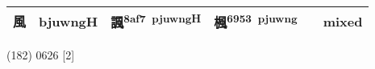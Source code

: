 \documentclass[14pt,a4paper]{scrartcl}
\begin{document}
\begin{longtable}[c]{@{}llllll@{}}
\begin{minipage}[t]{0.14\columnwidth}\raggedright\strut
風
\strut\end{minipage} &
\begin{minipage}[t]{0.14\columnwidth}\raggedright\strut
bjuwngH
\strut\end{minipage} &
\begin{minipage}[t]{0.14\columnwidth}\raggedright\strut
諷\textsuperscript{8af7~pjuwngH}
\strut\end{minipage} &
\begin{minipage}[t]{0.14\columnwidth}\raggedright\strut
楓\textsuperscript{6953~pjuwng}
\strut\end{minipage} &
\begin{minipage}[t]{0.14\columnwidth}\raggedright\strut
\strut\end{minipage} &
\begin{minipage}[t]{0.14\columnwidth}\raggedright\strut
mixed
\strut\end{minipage}\tabularnewline
\bottomrule
\end{longtable}

(182) 0626 {[}2{]}
\end{document}
